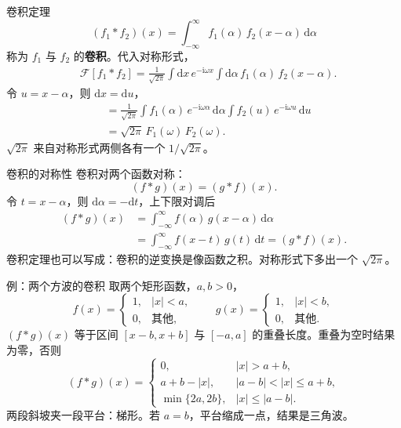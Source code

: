 \documentclass[fontset=windows, chinese, 10pt, xcolor=dvipsnames]{beamer}
\begin{document}
\begin{frame}{卷积定理}
  \begin{equation*}
    (f_1*f_2)(x)
    =\int_{-\infty}^{\infty}
      f_1(\alpha)\,f_2(x-\alpha)\,\mathrm{d}\alpha
  \end{equation*}
  称为 $f_1$ 与 $f_2$ 的\textbf{卷积}。代入对称形式，
  \begin{align*}
    &\mathcal{F}[f_1*f_2]
    =\frac{1}{\sqrt{2\pi}}\int\mathrm{d}x\,e^{-\mathrm{i}\omega x}
      \int\mathrm{d}\alpha\,f_1(\alpha)\,f_2(x-\alpha).
  \end{align*}
  令 $u=x-\alpha$，则 $\mathrm{d}x=\mathrm{d}u$，
  \begin{align*}
    &=\frac{1}{\sqrt{2\pi}}
      \int f_1(\alpha)\,e^{-\mathrm{i}\omega\alpha}\,\mathrm{d}\alpha
      \int f_2(u)\,e^{-\mathrm{i}\omega u}\,\mathrm{d}u \\
    &=\sqrt{2\pi}\,F_1(\omega)\,F_2(\omega).
  \end{align*}
  $\sqrt{2\pi}$ 来自对称形式两侧各有一个 $1/\sqrt{2\pi}$。
\end{frame}

\begin{frame}{卷积的对称性}
  卷积对两个函数对称：
  \begin{equation*}
    (f*g)(x)=(g*f)(x).
  \end{equation*}
  令 $t=x-\alpha$，则 $\mathrm{d}\alpha=-\mathrm{d}t$，上下限对调后
  \begin{align*}
    (f*g)(x)
    &=\int_{-\infty}^{\infty} f(\alpha)\,g(x-\alpha)\,\mathrm{d}\alpha \\
    &=\int_{-\infty}^{\infty} f(x-t)\,g(t)\,\mathrm{d}t
    =(g*f)(x).
  \end{align*}
  卷积定理也可以写成：卷积的逆变换是像函数之积。对称形式下多出一个 $\sqrt{2\pi}$。
\end{frame}

\begin{frame}{例：两个方波的卷积}
  取两个矩形函数，$a,b>0$，
  \begin{equation*}
    f(x)=\begin{cases}1,&|x|<a,\\0,&\text{其他},\end{cases}
    \qquad
    g(x)=\begin{cases}1,&|x|<b,\\0,&\text{其他}.\end{cases}
  \end{equation*}
  $(f*g)(x)$ 等于区间 $[x-b,x+b]$ 与 $[-a,a]$ 的重叠长度。重叠为空时结果为零，否则
  \begin{equation*}
    (f*g)(x)=
    \begin{cases}
      0, & |x|>a+b,\\
      a+b-|x|, & |a-b|<|x|\le a+b,\\
      \min\{2a,2b\}, & |x|\le |a-b|.
    \end{cases}
  \end{equation*}
  两段斜坡夹一段平台：梯形。若 $a=b$，平台缩成一点，结果是三角波。
\end{frame}
\end{document}

